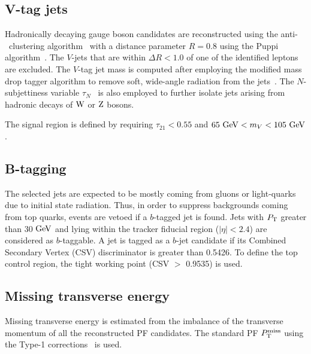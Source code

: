 \subsection{V-tag jets}
Hadronically decaying gauge boson candidates are reconstructed using the anti-\kt~clustering algorithm~\cite{antikt} with a distance parameter $R=0.8$ using the Puppi algorithm~\cite{Bertolini:2014bba}. The $V$-jets that are within $\Delta R < 1.0$ of one of the identified leptons are excluded. The $V$-tag jet mass is computed after employing the modified mass drop tagger algorithm to remove soft, wide-angle radiation from the jets~\cite{Dasgupta:2013ihk,Larkoski:2014wba}. The $N$-subjettiness variable $\tau_N$~\cite{Thaler:2010tr} is also employed to further isolate jets arising from hadronic decays of $\mathrm{W}$ or $\mathrm{Z}$ bosons.   

The signal region is defined by requiring $\tau_{21}<0.55$ and $ 65 ~\mathrm{GeV} < m_{V} < 105 ~\mathrm{GeV}$.

\subsection{B-tagging}

The selected jets are expected to be mostly coming from gluons or light-quarks
due to initial state radiation. Thus, in order to suppress backgrounds coming from top quarks, events are vetoed if a $b$-tagged jet is found.
Jets with $P_\mathrm{T}$ greater than 30 $\mathrm{GeV}$ and lying within the tracker fiducial region ($\left|\eta\right|<2.4$) are considered as $b$-taggable.
A jet is tagged as a $b$-jet candidate if its Combined Secondary Vertex (CSV) discriminator is greater than 0.5426. To define the top control region, the tight working point (CSV $>$ 0.9535) is used.


\subsection{Missing transverse energy}
Missing transverse energy is estimated from the imbalance of the transverse momentum of all the reconstructed PF candidates. The standard PF $P_\mathrm{T}^{\mathrm{miss}}$ using the Type-1 corrections~\cite{cms-met-analysis-twiki} is used. 

